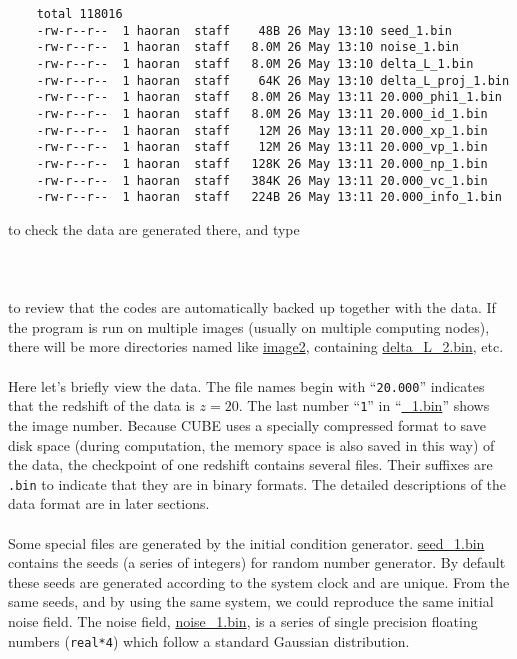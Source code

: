 \documentclass[12pt]{article}
\begin{document}
\begin{verbatim}
    total 118016
    -rw-r--r--  1 haoran  staff    48B 26 May 13:10 seed_1.bin
    -rw-r--r--  1 haoran  staff   8.0M 26 May 13:10 noise_1.bin
    -rw-r--r--  1 haoran  staff   8.0M 26 May 13:10 delta_L_1.bin
    -rw-r--r--  1 haoran  staff    64K 26 May 13:10 delta_L_proj_1.bin
    -rw-r--r--  1 haoran  staff   8.0M 26 May 13:11 20.000_phi1_1.bin
    -rw-r--r--  1 haoran  staff   8.0M 26 May 13:11 20.000_id_1.bin
    -rw-r--r--  1 haoran  staff    12M 26 May 13:11 20.000_xp_1.bin
    -rw-r--r--  1 haoran  staff    12M 26 May 13:11 20.000_vp_1.bin
    -rw-r--r--  1 haoran  staff   128K 26 May 13:11 20.000_np_1.bin
    -rw-r--r--  1 haoran  staff   384K 26 May 13:11 20.000_vc_1.bin
    -rw-r--r--  1 haoran  staff   224B 26 May 13:11 20.000_info_1.bin
\end{verbatim}
to check the data are generated there, and type
\\\\
\\\\
to review that the codes are automatically backed up together with the data. If the program is run on multiple images (usually on multiple computing nodes), there will be more directories named like \url{image2}, containing \url{delta_L_2.bin}, etc.
\\\\
Here let's briefly view the data. The file names begin with ``{\tt 20.000}'' indicates that the redshift of the data is $z=20$. The last number ``{\tt 1}'' in ``\url{_1.bin}'' shows the image number. Because CUBE uses a specially compressed format to save disk space (during computation, the memory space is also saved in this way) of the data, the checkpoint of one redshift contains several files. Their suffixes are {\tt *.bin} to indicate that they are in binary formats. The detailed descriptions of the data format are in later sections.
\\\\
Some special files are generated by the initial condition generator. \url{seed_1.bin} contains the seeds (a series of integers) for random number generator. By default these seeds are generated according to the system clock and are unique. From the same seeds, and by using the same system, we could reproduce the same initial noise field. The noise field, \url{noise_1.bin}, is a series of single precision floating numbers ({\tt real*4}) which follow a standard Gaussian distribution. 
\end{document}
